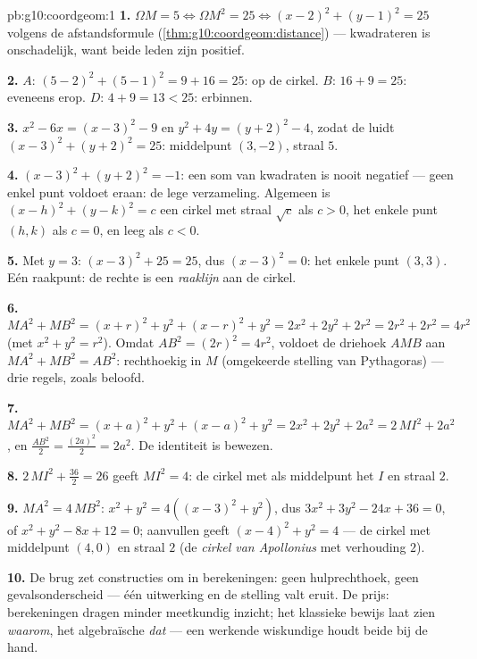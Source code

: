 \begin{solution}{pb:g10:coordgeom:1}
\textbf{1.} $\Omega M = 5 \iff \Omega M^2 = 25 \iff
(x - 2)^2 + (y - 1)^2 = 25$ volgens de afstandsformule
(\cref{thm:g10:coordgeom:distance}) --- kwadrateren is onschadelijk, want
beide leden zijn positief.

\textbf{2.} $A$: $(5-2)^2 + (5-1)^2 = 9 + 16 = 25$: op de cirkel. $B$:
$16 + 9 = 25$: eveneens erop. $D$: $4 + 9 = 13 < 25$: erbinnen.

\textbf{3.} $x^2 - 6x = (x - 3)^2 - 9$ en $y^2 + 4y = (y + 2)^2 - 4$, zodat
de  luidt $(x - 3)^2 + (y + 2)^2 = 25$: middelpunt $(3, -2)$,
straal $5$.

\textbf{4.} $(x - 3)^2 + (y + 2)^2 = -1$: een som van kwadraten is nooit
negatief --- geen enkel punt voldoet eraan: de lege verzameling. Algemeen is
$(x - h)^2 + (y - k)^2 = c$ een cirkel met straal $\sqrt c$ als $c > 0$, het
enkele punt $(h, k)$ als $c = 0$, en leeg als $c < 0$.

\textbf{5.} Met $y = 3$: $(x - 3)^2 + 25 = 25$, dus $(x - 3)^2 = 0$: het
enkele punt $(3, 3)$. Eén raakpunt: de rechte is een \emph{raaklijn} aan de
cirkel.

\textbf{6.} $MA^2 + MB^2 = (x + r)^2 + y^2 + (x - r)^2 + y^2
= 2x^2 + 2y^2 + 2r^2 = 2r^2 + 2r^2 = 4r^2$ (met $x^2 + y^2 = r^2$). Omdat
$AB^2 = (2r)^2 = 4r^2$, voldoet de driehoek $AMB$ aan
$MA^2 + MB^2 = AB^2$: rechthoekig in $M$ (omgekeerde stelling van
Pythagoras) --- drie regels, zoals beloofd.

\textbf{7.} $MA^2 + MB^2 = (x + a)^2 + y^2 + (x - a)^2 + y^2
= 2x^2 + 2y^2 + 2a^2 = 2\,MI^2 + 2a^2$, en
$\frac{AB^2}{2} = \frac{(2a)^2}{2} = 2a^2$. De identiteit is bewezen.

\textbf{8.} $2\,MI^2 + \frac{36}{2} = 26$ geeft $MI^2 = 4$: de cirkel met
als middelpunt het  $I$ en straal $2$.

\textbf{9.} $MA^2 = 4\,MB^2$: $x^2 + y^2 = 4\left((x - 3)^2 + y^2\right)$,
dus $3x^2 + 3y^2 - 24x + 36 = 0$, of $x^2 + y^2 - 8x + 12 = 0$; aanvullen
geeft $(x - 4)^2 + y^2 = 4$ --- de cirkel met middelpunt $(4, 0)$ en straal
$2$ (de \emph{cirkel van Apollonius} met verhouding $2$).

\textbf{10.} De brug zet constructies om in berekeningen: geen hulprechthoek,
geen gevalsonderscheid --- één uitwerking en de stelling valt eruit. De
prijs: berekeningen dragen minder meetkundig inzicht; het klassieke bewijs
laat zien \emph{waarom}, het algebraïsche \emph{dat} --- een werkende
wiskundige houdt beide bij de hand.


\end{solution}
